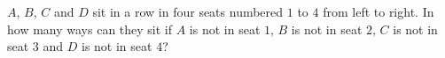 $A$, $B$, $C$ and $D$ sit in a row in four seats numbered $1$ to $4$ from left to right. In how many ways can they sit if $A$ is not in seat $1$, $B$ is not in seat $2$, $C$ is not in seat $3$ and $D$ is not in seat $4$?
